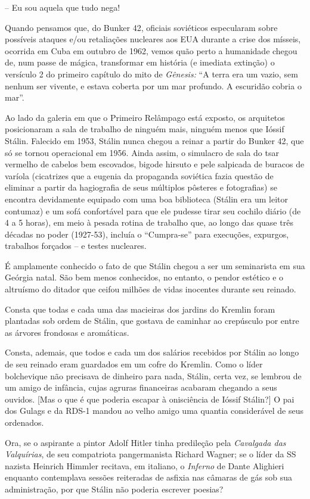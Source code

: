 -- Eu sou aquela que tudo nega!

Quando pensamos que, do Bunker 42, oficiais soviéticos especularam sobre
possíveis ataques e/ou retaliações nucleares aos EUA durante a crise dos
mísseis, ocorrida em Cuba em outubro de 1962, vemos quão perto a
humanidade chegou de, num passe de mágica, transformar em história (e
imediata extinção) o versículo 2 do primeiro capítulo do mito de
\emph{Gênesis:} ``A terra era um vazio, sem nenhum ser vivente, e estava
coberta por um mar profundo. A escuridão cobria o mar''.

Ao lado da galeria em que o Primeiro Relâmpago está exposto, os
arquitetos posicionaram a sala de trabalho de ninguém mais, ninguém
menos que Ióssif Stálin. Falecido em 1953, Stálin nunca chegou a reinar
a partir do Bunker 42, que só se tornou operacional em 1956. Ainda
assim, o simulacro de sala do tsar vermelho de cabelos bem escovados,
bigode hirsuto e pele salpicada de buracos de varíola (cicatrizes que a
eugenia da propaganda soviética fazia questão de eliminar a partir da
hagiografia de seus múltiplos pôsteres e fotografias) se encontra
devidamente equipado com uma boa biblioteca (Stálin era um leitor
contumaz) e um sofá confortável para que ele pudesse tirar seu cochilo
diário (de 4 a 5 horas), em meio à pesada rotina de trabalho que, ao
longo das quase três décadas no poder (1927-53), incluía o ``Cumpra-se''
para execuções, expurgos, trabalhos forçados -- e testes nucleares.

É amplamente conhecido o fato de que Stálin chegou a ser um seminarista
em sua Geórgia natal. São bem menos conhecidos, no entanto, o pendor
estético e o altruísmo do ditador que ceifou milhões de vidas inocentes
durante seu reinado.

Consta que todas e cada uma das macieiras dos jardins do Kremlin foram
plantadas sob ordem de Stálin, que gostava de caminhar ao crepúsculo por
entre as árvores frondosas e aromáticas.

Consta, ademais, que todos e cada um dos salários recebidos por Stálin
ao longo de seu reinado eram guardados em um cofre do Kremlin. Como o
líder bolchevique não precisava de dinheiro para nada, Stálin, certa
vez, se lembrou de um amigo de infância, cujas agruras financeiras
acabaram chegando a seus ouvidos. {[}Mas o que é que poderia escapar à
onisciência de Ióssif Stálin?{]} O pai dos Gulags e da RDS-1 mandou ao
velho amigo uma quantia considerável de seus ordenados.

Ora, se o aspirante a pintor Adolf Hitler tinha predileção pela
\emph{Cavalgada das Valquírias}, de seu compatriota pangermanista
Richard Wagner; se o líder da SS nazista Heinrich Himmler recitava, em
italiano, o \emph{Inferno} de Dante Alighieri enquanto contemplava
sessões reiteradas de asfixia nas câmaras de gás sob sua administração,
por que Stálin não poderia escrever poesias?

